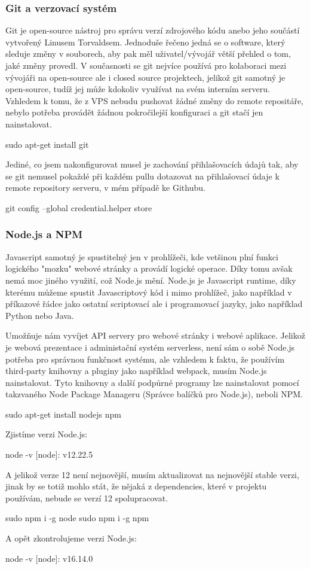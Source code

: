 \documentclass[12pt,a4paper]{report}
\begin{document}
  \subsubsection{Git a verzovací systém}
  Git je open-source nástroj pro správu verzí zdrojového kódu anebo jeho součástí vytvořený Linusem Torvaldsem. Jednoduše řečeno jedná se o software, který sleduje změny v souborech, aby pak měl uživatel/vývojář 
  větší přehled o tom, jaké změny provedl. V současnosti se git nejvíce používá pro kolaboraci mezi vývojáři na open-source ale i closed source projektech, jelikož git samotný je open-source, tudíž jej může kdokoliv využívat na svém interním serveru.
  Vzhledem k tomu, že z VPS nebudu pushovat žádné změny do remote repositáře, nebylo potřeba provádět žádnou pokročilejší konfiguraci a git stačí jen nainstalovat.
  \begin{bash}
    sudo apt-get install git
  \end{bash}
  Jediné, co jsem nakonfigurovat musel je zachování přihlašovacích údajů tak, aby se git nemusel pokaždé při každém pullu dotazovat na přihlašovací údaje k remote repository serveru, v mém případě ke Githubu.
  \begin{bash}
    git config --global credential.helper store
  \end{bash}
  \subsubsection{Node.js a NPM}
  Javascript samotný je spustitelný jen v prohlížeči, kde vetšinou plní funkci logického "mozku" webové stránky a provádí logické operace. Díky tomu avšak nemá moc jiného využití, což Node.js mění.
  Node.js je Javascript runtime, díky kterému můžeme spustit Javascriptový kód i mimo prohlížeč, jako například v příkazové řádce jako ostatní scriptovací ale i programovací jazyky, jako například Python nebo Java.
 
  Umožňuje nám vyvíjet API servery pro webové stránky i webové aplikace. 
  Jelikož je webová prezentace i administační systém serverless, není sám o sobě Node.js potřeba pro správnou funkčnost systému, ale vzhledem k faktu, že
  používím third-party knihovny a pluginy jako například webpack, musím Node.js nainstalovat. Tyto knihovny a další podpůrné programy lze nainstalovat pomocí takzvaného Node Package Manageru (Správce balíčků pro Node.js), neboli NPM.
  \begin{bash}
    sudo apt-get install nodejs npm
  \end{bash}
  Zjistíme verzi Node.js:
  \begin{bash}
    node -v
    [node]: v12.22.5
  \end{bash}
  A jelikož verze 12 není nejnovější, musím aktualizovat na nejnovější stable verzi, jinak by se totiž mohlo stát, že nějaká z dependencies, které v projektu používám, nebude se verzí 12 spolupracovat.
  \begin{bash}
    sudo npm i -g node
    sudo npm i -g npm
  \end{bash}
  A opět zkontrolujeme verzi Node.js:
  \begin{bash}
    node -v
    [node]: v16.14.0
  \end{bash}
\end{document}
